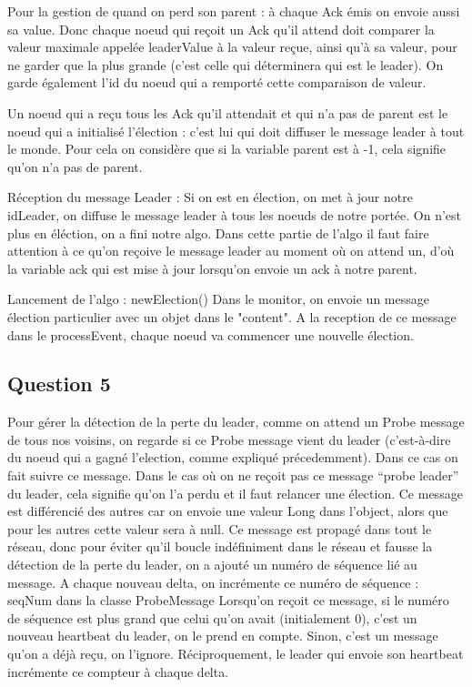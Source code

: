 \documentclass[paper=a4, fontsize=11pt]{article} %
\begin{document}
Pour la gestion de quand on perd son parent : à chaque Ack émis on envoie aussi sa value. Donc chaque noeud qui reçoit un Ack qu'il attend doit comparer la valeur maximale appelée leaderValue à la valeur reçue, ainsi qu'à sa valeur, pour ne garder que la plus grande (c'est celle qui déterminera qui est le leader). On garde également l'id du noeud qui a remporté cette comparaison de valeur.

Un noeud qui a reçu tous les Ack qu'il attendait et qui n'a pas de parent est le noeud qui a initialisé l'élection : c'est lui qui doit diffuser le message leader à tout le monde. Pour cela on considère que si la variable parent est à -1, cela signifie qu'on n'a pas de parent.

Réception du message Leader :
Si on est en élection, on met à jour notre idLeader, on diffuse le message leader à tous les noeuds de notre portée. On n'est plus en éléction, on a fini notre algo.
Dans cette partie de l'algo il faut faire attention à ce qu'on reçoive le message leader au moment où on attend un, d'où la variable ack qui est mise à jour lorsqu'on envoie un ack à notre parent.


Lancement de l'algo : newElection()
Dans le monitor, on envoie un message élection particulier avec un objet dans le "content". A la reception de ce message dans le processEvent, chaque noeud va commencer une nouvelle élection.

\subsection{Question 5}
Pour gérer la détection de la perte du leader, comme on attend un Probe message de tous nos voisins, on regarde si ce Probe message vient du leader (c'est-à-dire du noeud qui a gagné l'election, comme expliqué précedemment).
Dans ce cas on fait suivre ce message.
Dans le cas où on ne reçoit pas ce message \enquote{probe leader} du leader, cela signifie qu'on l'a perdu et il faut relancer une élection.
Ce message est différencié des autres car on envoie une valeur Long dans l'object, alors que pour les autres cette valeur sera à null.
Ce message est propagé dans tout le réseau, donc pour éviter qu'il boucle indéfiniment dans le réseau et fausse la détection de la perte du leader, on a ajouté un numéro de séquence lié au message.
A chaque nouveau delta, on incrémente ce numéro de séquence : seqNum dans la classe ProbeMessage
Lorsqu'on reçoit ce message, si le numéro de séquence est plus grand que celui qu'on avait (initialement 0), c'est un nouveau heartbeat du leader, on le prend en compte.
Sinon, c'est un message qu'on a déjà reçu, on l'ignore. Réciproquement, le leader qui envoie son heartbeat incrémente ce compteur à chaque delta.


\end{document}
